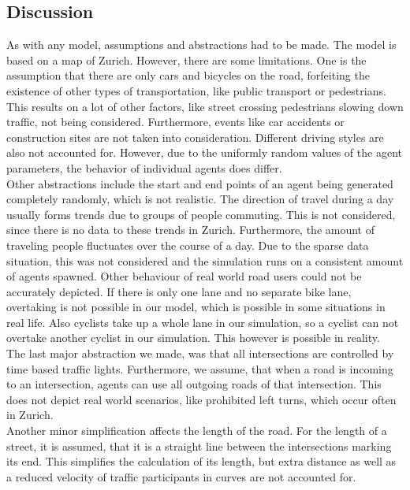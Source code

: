 \subsection{Discussion}\label{abstractions}
As with any model, assumptions and abstractions had to be made. The model is based on a map of Zurich. However, there are some limitations. One is the assumption that there are only cars and bicycles on the road, forfeiting the existence of other types of transportation, like public transport or pedestrians. This results on a lot of other factors, like street crossing pedestrians slowing down traffic, not being considered. Furthermore, events like car accidents or construction sites are not taken into consideration. Different driving styles are also not accounted for. However, due to the uniformly random values of the agent parameters, the behavior of individual agents does differ.\\
Other abstractions include the start and end points of an agent being generated completely randomly, which is not realistic. The direction of travel during a day usually forms trends due to groups of people commuting. This is not considered, since there is no data to these trends in Zurich. Furthermore, the amount of traveling people fluctuates over the course of a day. Due to the sparse data situation, this was not considered and the simulation runs on a consistent amount of agents spawned. Other behaviour of real world road users could not be accurately depicted. If there is only one lane and no separate bike lane, overtaking is not possible in our model, which is possible in some situations in real life. Also cyclists take up a whole lane in our simulation, so a cyclist can not overtake another cyclist in our simulation. This however is possible in reality. \\
The last major abstraction we made, was that all intersections are controlled by time based traffic lights. Furthermore, we assume, that when a road is incoming to an intersection, agents can use all outgoing roads of that intersection. This does not depict real world scenarios, like prohibited left turns, which occur often in Zurich.\\
Another minor simplification affects the length of the road. For the length of a  street, it is assumed, that it is a straight line between the intersections marking its end. This simplifies the calculation of its length, but extra distance as well as a reduced velocity of traffic participants in curves are not accounted for. 
